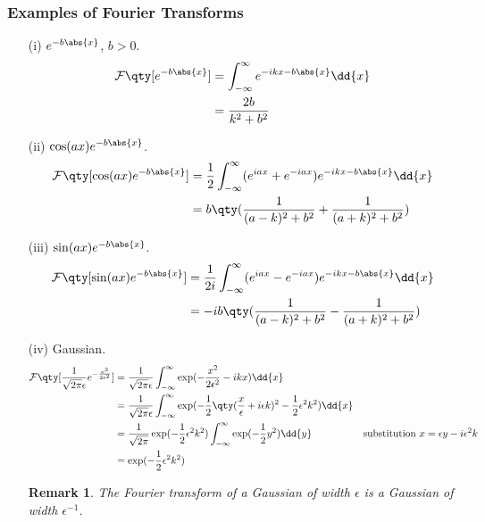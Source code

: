 \documentclass{article}
\theoremstyle{plain}\theoremheaderfont{\normalfont\itshape}\theorembodyfont{\rmfamily}\theoremseparator{.}\newtheorem*{rem}{Remark}\newtheorem*{ex}{Example}\newtheorem*{proof}{Proof}\newtheorem*{altp}{Alternative proof}
\theoremstyle{plain}\theoremheaderfont{\normalfont\bfseries}\theorembodyfont{\rmfamily}\theoremseparator{.}\newtheorem{thm}{Theorem}[section]\newtheorem{lem}[thm]{Lemma}\newtheorem{prop}[thm]{Proposition}\newtheorem*{cor}{Corollary}\newtheorem{defn}[thm]{Definition}\newtheorem{clm}[thm]{Claim}\newtheorem{clminproof}{Claim}
\theoremstyle{break}\theoremheaderfont{\normalfont\itshape}\theorembodyfont{\rmfamily}\theoremseparator{.\medskip}\newtheorem*{proofskip}{Proof}\newtheorem*{exs}{Examples}\newtheorem*{rems}{Remarks}
\theoremstyle{break}\theoremheaderfont{\normalfont\bfseries}\theorembodyfont{\rmfamily}\theoremseparator{.\medskip}\newtheorem{lemskip}[thm]{Lemma}\newtheorem{defnskip}[thm]{Definition}\newtheorem{propskip}[thm]{Proposition}\newtheorem{thmskip}[thm]{Theorem}
\numberwithin{equation}{section}
\begin{document}
	\subsubsection{Examples of Fourier Transforms}
	\begin{itemize}
		\item[(i)] \(e^{-b\abs{x}}\), \(b>0\).
		\begin{align*}
			\mathcal{F}\qty[e^{-b\abs{x}}]&=\int_{-\infty}^{\infty}e^{-ikx-b\abs{x}}\dd{x}\\
			&=\frac{2b}{k^2+b^2}
		\end{align*}
		
		\item[(ii)] \(\cos(ax)e^{-b\abs{x}}\).
		\begin{align*}
			\mathcal{F}\qty[\cos(ax)e^{-b\abs{x}}]&=\frac{1}{2}\int_{-\infty}^{\infty}(e^{iax}+e^{-iax})e^{-ikx-b\abs{x}}\dd{x}\\
			&=b\qty(\frac{1}{(a-k)^2+b^2}+\frac{1}{(a+k)^2+b^2})
		\end{align*}
		
		\item[(iii)] \(\sin(ax)e^{-b\abs{x}}\).
		\begin{align*}
			\mathcal{F}\qty[\sin(ax)e^{-b\abs{x}}]&=\frac{1}{2i}\int_{-\infty}^{\infty}(e^{iax}-e^{-iax})e^{-ikx-b\abs{x}}\dd{x}\\
			&=-ib\qty(\frac{1}{(a-k)^2+b^2}-\frac{1}{(a+k)^2+b^2})
		\end{align*}
		
		\item[(iv)] Gaussian.
		\begin{align*}
			\mathcal{F}\qty[\frac{1}{\sqrt{2\pi}\epsilon}e^{-\frac{x^2}{2\epsilon^2}}]&=\frac{1}{\sqrt{2\pi}\epsilon}\int_{-\infty}^{\infty}\exp(-\frac{x^2}{2\epsilon^2}-ikx)\dd{x}\\
			&=\frac{1}{\sqrt{2\pi}\epsilon}\int_{-\infty}^{\infty}\exp(-\frac{1}{2}\qty(\frac{x}{\epsilon}+i\epsilon k)^2-\frac{1}{2}\epsilon^2k^2)\dd{x}\\
			&=\frac{1}{\sqrt{2\pi}}\exp(-\frac{1}{2}\epsilon^2k^2)\int_{-\infty}^{\infty}\exp(-\frac{1}{2}y^2)\dd{y} &\text{substitution }x=\epsilon y-i\epsilon^2 k\\
			&=\exp(-\frac{1}{2}\epsilon^2k^2)
		\end{align*}
		\begin{rem}
			The Fourier transform of a Gaussian of width \(\epsilon\) is a Gaussian of width \(\epsilon^{-1}\).
		\end{rem}


\end{itemize}
\end{document}
